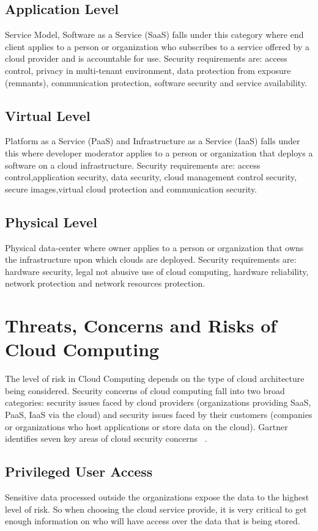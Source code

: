 \documentclass[sigconf]{acmart}
\begin{document}
\subsection{Application Level} 
Service Model, Software as a Service (SaaS) falls under this category 
where end client applies to a person or organization who subscribes
to a service offered by a cloud provider and is accountable for use. 
Security requirements are: access control, privacy in multi-tenant environment, 
data protection from exposure (remnants), communication protection, 
software security and service availability.

\subsection{Virtual Level}
Platform as a Service (PaaS) and Infrastructure as a Service (IaaS) falls 
under this where developer moderator applies to a person or organization 
that deploys a software on a cloud infrastructure. 
Security requirements are: access control,application security, data security,
cloud management control security, secure images,virtual cloud protection 
and communication security.

\subsection{Physical Level}
Physical data-center where owner applies to a person or organization 
that owns the infrastructure upon which clouds are deployed. 
Security requirements are: hardware security, legal not abusive 
use of cloud computing, hardware reliability, network protection 
and network resources protection.

\section{Threats, Concerns and Risks of Cloud Computing}
The level of risk in Cloud Computing depends on the type of cloud 
architecture being considered. Security concerns of cloud computing 
fall into two broad categories: security issues faced by cloud providers 
(organizations providing SaaS, PaaS, IaaS via the cloud) and 
security issues faced by their customers (companies or organizations who 
host applications or store data on the cloud). Gartner identifies seven key
areas of cloud security concerns ~\cite{hid-sp18-513-gartner}.

\subsection{Privileged User Access}
Sensitive data processed outside the organizations expose the data to the
highest level of risk. So when choosing the cloud service provide, it is
very critical to get enough information on who will have access over the data
that is being stored.
\end{document}
